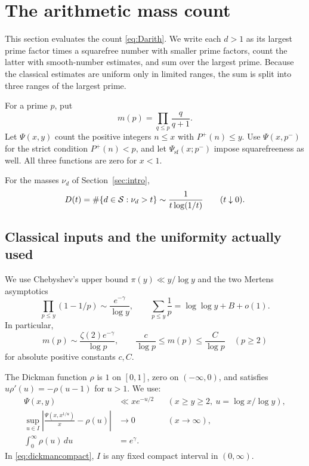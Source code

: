 \section{The arithmetic mass count}\label{sec:arithmetic}
This section evaluates the count \eqref{eq:Darith}. We write each
$d>1$ as its largest prime factor times a squarefree number with smaller
prime factors, count the latter with smooth-number estimates, and sum over
the largest prime. Because the classical estimates are uniform only in
limited ranges, the sum is split into three ranges of the largest prime.

For a prime $p$, put
\[
 m(p)=\prod_{q\le p}\frac q{q+1}.
\]
Let $\Psi(x,y)$ count the positive integers $n\le x$ with $P^+(n)\le y$.
Use $\Psi(x,p^-)$ for the strict condition $P^+(n)<p$, and let
$\Psi_{\mathrm{sf}}(x;p^-)$ impose squarefreeness as well.
All three functions are zero for $x<1$.

\begin{theorem}\label{thm:arithmetic}
For the masses $\nu_d$ of Section~\ref{sec:intro},
\[
 D(t)=\#\{d\in\mathcal S:\nu_d>t\}
 \sim\frac1{t\log(1/t)}\qquad(t\downarrow0).
\]
\end{theorem}

\subsection{Classical inputs and the uniformity actually used}
We use Chebyshev's upper bound $\pi(y)\ll y/\log y$ and the two Mertens
asymptotics
\[
 \prod_{p\le y}(1-1/p)\sim\frac{e^{-\gamma}}{\log y},
 \qquad \sum_{p\le y}\frac1p=\log\log y+B+o(1).
\]
In particular,
\begin{equation}\label{eq:mproduct}
 m(p)\sim\frac{\zeta(2)e^{-\gamma}}{\log p},
 \qquad \frac{c}{\log p}\le m(p)\le\frac C{\log p}\quad(p\ge2)
\end{equation}
for absolute positive constants $c,C$.

The Dickman function $\rho$ is $1$ on $[0,1]$, zero on $(-\infty,0)$, and
satisfies $u\rho'(u)=-\rho(u-1)$ for $u>1$. We use:
\begin{align}
 \Psi(x,y)&\ll x e^{-u/2}
 &&(x\ge y\ge2,\ u=\log x/\log y),\label{eq:rankin}\\
 \sup_{u\in I}\left|\frac{\Psi(x,x^{1/u})}{x}-\rho(u)\right|&\longrightarrow0
 &&(x\to\infty),\label{eq:dickmancompact}\\
 \int_0^\infty\rho(u)\,du&=e^\gamma.\label{eq:dickmanintegral}
\end{align}
In \eqref{eq:dickmancompact}, $I$ is any fixed compact interval in
$(0,\infty)$.

